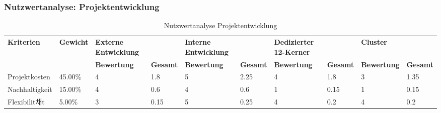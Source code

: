 \subsubsection{Nutzwertanalyse: Projektentwicklung}
\begin{table}[!htp]
\centering
\caption{Nutzwertanalyse Projektentwicklung}
\label{nwa_projektentwicklung}
\begin{tabular}{llllllllll}
\rowcolor[HTML]{9698ED}
{\color[HTML]{FFFFFF} \textbf{Kriterien}} & {\color[HTML]{FFFFFF} \textbf{Gewicht}} & {\color[HTML]{FFFFFF} \textbf{Externe Entwicklung}} & {\color[HTML]{FFFFFF} \textbf{}}       & {\color[HTML]{FFFFFF} \textbf{Interne Entwicklung}} & {\color[HTML]{FFFFFF} \textbf{}}       & {\color[HTML]{FFFFFF} \textbf{Dedizierter 12-Kerner}} & {\color[HTML]{FFFFFF} \textbf{}}       & {\color[HTML]{FFFFFF} \textbf{Cluster}}   & {\color[HTML]{FFFFFF} \textbf{}}       \\
\rowcolor[HTML]{9698ED}
{\color[HTML]{FFFFFF} \textbf{}}          & {\color[HTML]{FFFFFF} \textbf{}}        & {\color[HTML]{FFFFFF} \textbf{Bewertung}}           & {\color[HTML]{FFFFFF} \textbf{Gesamt}} & {\color[HTML]{FFFFFF} \textbf{Bewertung}}           & {\color[HTML]{FFFFFF} \textbf{Gesamt}} & {\color[HTML]{FFFFFF} \textbf{Bewertung}}             & {\color[HTML]{FFFFFF} \textbf{Gesamt}} & {\color[HTML]{FFFFFF} \textbf{Bewertung}} & {\color[HTML]{FFFFFF} \textbf{Gesamt}} \\
Projektkosten                             & 45.00\%                                 & 4                                                   & 1.8                                    & 5                                                   & 2.25                                   & 4                                                     & 1.8                                    & 3                                         & 1.35                                   \\
\rowcolor[HTML]{BBDAFF}
Nachhaltigkeit                            & 15.00\%                                 & 4                                                   & 0.6                                    & 4                                                   & 0.6                                    & 1                                                     & 0.15                                   & 1                                         & 0.15                                   \\
Flexibilit채t                              & 5.00\%                                  & 3                                                   & 0.15                                   & 5                                                   & 0.25                                   & 4                                                     & 0.2                                    & 4                                         & 0.2                                    \\

\end{tabular}
\end{table}
